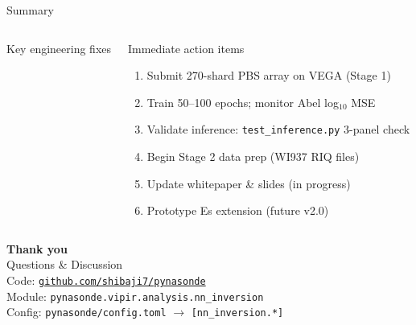 \documentclass[aspectratio=169,10pt]{beamer}
\begin{document}
\begin{frame}{Summary}
\begin{columns}
\begin{alertblock}{\centering\scriptsize Key engineering fixes}
\begin{itemize}
  \end{itemize}
\end{alertblock}
\begin{exampleblock}{\centering\scriptsize Immediate action items}
  \scriptsize
  \begin{enumerate}
    \item Submit 270-shard PBS array on VEGA (Stage 1)
    \item Train 50--100 epochs; monitor Abel log$_{10}$ MSE
    \item Validate inference: \texttt{test\_inference.py} 3-panel check
    \item Begin Stage 2 data prep (WI937 RIQ files)
    \item Update whitepaper \& slides (in progress)
    \item Prototype Es extension (future v2.0)
  \end{enumerate}
\end{exampleblock}
\end{columns}
\end{frame}

\begin{frame}[plain]
  \begin{center}
    \vspace{1.5cm}
    {\LARGE \textbf{Thank you}}\\[12pt]
    {\large Questions \& Discussion}\\[20pt]
    \small
    Code: \href{https://github.com/shibaji7/pynasonde}{\texttt{github.com/shibaji7/pynasonde}}\\[4pt]
    Module: \texttt{pynasonde.vipir.analysis.nn\_inversion}\\[4pt]
    Config: \texttt{pynasonde/config.toml} $\to$ \texttt{[nn\_inversion.*]}
  \end{center}
\end{frame}
\end{document}

